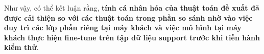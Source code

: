 Như vậy, có thể kết luận rằng, \textbf{tính cá nhân hóa của thuật toán đề xuất đã được cải thiện so với các thuật toán trong phần so sánh nhờ vào việc duy trì các lớp phần riêng tại máy khách và việc mô hình tại máy khách thực hiện fine-tune trên tập dữ liệu support trước khi tiến hành kiểm thử}.



